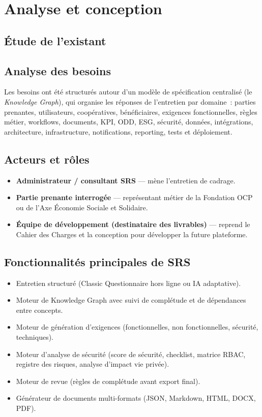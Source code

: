 \chapter{Analyse et conception}

\section{Étude de l'existant}

\section{Analyse des besoins}
Les besoins ont été structurés autour d'un modèle de spécification centralisé (le
\emph{Knowledge Graph}), qui organise les réponses de l'entretien par domaine~:
parties prenantes, utilisateurs, coopératives, bénéficiaires, exigences fonctionnelles,
règles métier, workflows, documents, KPI, ODD, ESG, sécurité, données, intégrations,
architecture, infrastructure, notifications, reporting, tests et déploiement.

\section{Acteurs et rôles}
\begin{itemize}
    \item \textbf{Administrateur / consultant SRS} — mène l'entretien de cadrage.
    \item \textbf{Partie prenante interrogée} — représentant métier de la Fondation OCP
    ou de l'Axe Économie Sociale et Solidaire.
    \item \textbf{Équipe de développement (destinataire des livrables)} — reprend le
    Cahier des Charges et la conception pour développer la future plateforme.
\end{itemize}

\section{Fonctionnalités principales de SRS}
\begin{itemize}
    \item Entretien structuré (Classic Questionnaire hors ligne ou IA adaptative).
    \item Moteur de Knowledge Graph avec suivi de complétude et de dépendances entre
    concepts.
    \item Moteur de génération d'exigences (fonctionnelles, non fonctionnelles,
    sécurité, techniques).
    \item Moteur d'analyse de sécurité (score de sécurité, checklist, matrice RBAC,
    registre des risques, analyse d'impact vie privée).
    \item Moteur de revue (règles de complétude avant export final).
    \item Générateur de documents multi-formats (JSON, Markdown, HTML, DOCX, PDF).
\end{itemize}

